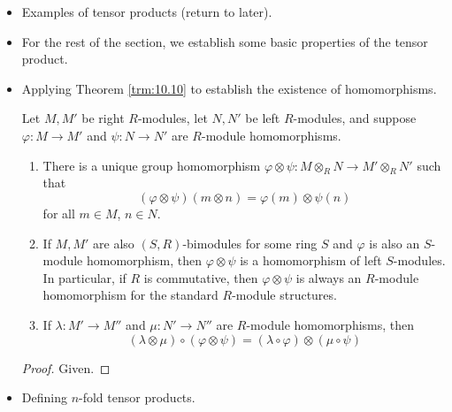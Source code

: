 \documentclass[../notes.tex]{subfiles}
\begin{document}
\begin{itemize}
\begin{corollary}
        \begin{proof}
            Given.
        \end{proof}
    \end{corollary}
    \item Examples of tensor products (return to later).
    \item For the rest of the section, we establish some basic properties of the tensor product.
    \item Applying Theorem \ref{trm:10.10} to establish the existence of homomorphisms.
    \begin{theorem}\label{trm:10.13}
        Let $M,M'$ be right $R$-modules, let $N,N'$ be left $R$-modules, and suppose $\varphi:M\to M'$ and $\psi:N\to N'$ are $R$-module homomorphisms.
        \begin{enumerate}[ref={\thetheorem(\arabic*)}]
            \item \label{trm:10.13.1}There is a unique group homomorphism $\varphi\otimes\psi:M\otimes_RN\to M'\otimes_RN'$ such that
            \begin{equation*}
                (\varphi\otimes\psi)(m\otimes n) = \varphi(m)\otimes\psi(n)
            \end{equation*}
            for all $m\in M$, $n\in N$.
            \item \label{trm:10.13.2}If $M,M'$ are also $(S,R)$-bimodules for some ring $S$ and $\varphi$ is also an $S$-module homomorphism, then $\varphi\otimes\psi$ is a homomorphism of left $S$-modules. In particular, if $R$ is commutative, then $\varphi\otimes\psi$ is always an $R$-module homomorphism for the standard $R$-module structures.
            \item \label{trm:10.13.3}If $\lambda:M'\to M''$ and $\mu:N'\to N''$ are $R$-module homomorphisms, then
            \begin{equation*}
                (\lambda\otimes\mu)\circ(\varphi\otimes\psi) = (\lambda\circ\varphi)\otimes(\mu\circ\psi)
            \end{equation*}
        \end{enumerate}
        \begin{proof}
            Given.
        \end{proof}
    \end{theorem}
    \item Defining $n$-fold tensor products.
    \begin{theorem}\label{trm:10.14}

\end{theorem}
\end{itemize}
\end{document}

